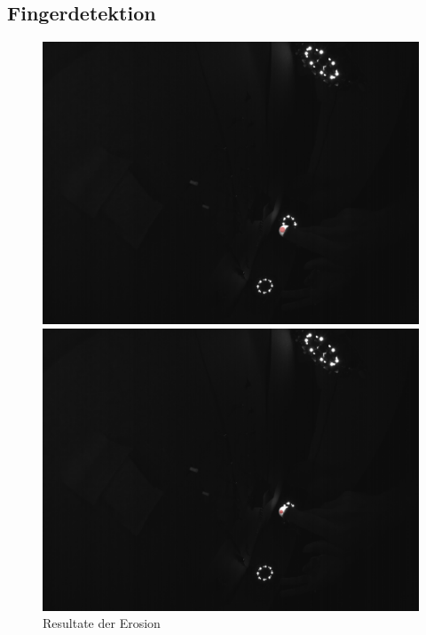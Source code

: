 \subsection{Fingerdetektion}
\label{chapter:fingerdetektion}
\begin{figure}
	\centering
	\begin{minipage}[b]{0.48\textwidth}	
		\includegraphics[trim = 270mm 90mm 90mm 170mm, clip, width=\textwidth]{Kapitel/30DatenPipeline/Bilder/schlechteBoundingboxen/pic775.png}
	\end{minipage}
	\hfill
	\begin{minipage}[b]{0.48\textwidth}		
		\includegraphics[trim = 270mm 90mm 90mm 170mm, clip,width=\textwidth]{Kapitel/30DatenPipeline/Bilder/schlechteBoundingboxen/pic777.png}
	\end{minipage}
	\caption{Resultate der Erosion}
	\label{img:Erosion}
\end{figure}
